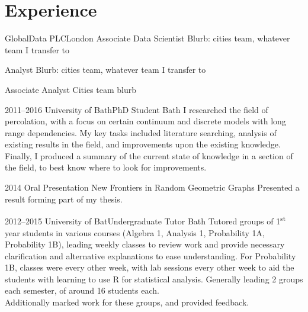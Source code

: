 \documentclass[print, oneside]{friggeri-cv} %
\begin{document}
\section{Experience}


\begin{entrylist}

\begin{stackedentry}{GlobalData PLC}{London}
{Associate Data Scientist}
{Blurb: cities team, whatever team I transfer to}

{Analyst}
{Blurb: cities team, whatever team I transfer to}

{Associate Analyst}
{Cities team blurb}
\end{stackedentry}

\entry
{2011--2016}
{University of Bath}{PhD Student}
{Bath}
{I researched the field of percolation, with a focus on certain continuum and discrete models with long range dependencies. My key tasks included literature searching, analysis of existing results in the field, and improvements upon the existing knowledge. Finally, I produced a summary of the current state of knowledge in a section of the field, to best know where to look for improvements.}

\entry
{2014}
{Oral Presentation}
{New Frontiers in Random Geometric Graphs}
{Presented a result forming part of my thesis.}




\entry
{2012--2015}
{University of Bat}{Undergraduate Tutor}
{Bath}
{Tutored groups of 1\textsuperscript{st} year students in various courses (Algebra 1, Analysis 1, Probability 1A, Probability 1B), leading weekly classes to review work and provide necessary clarification and alternative explanations to ease understanding. For Probability 1B, classes were every other week, with lab sessions every other week to aid the students with learning to use R for statistical analysis. Generally leading 2 groups each semester, of around 16 students each.\\
Additionally marked work for these groups, and provided feedback.}


\end{entrylist}
\end{document}
